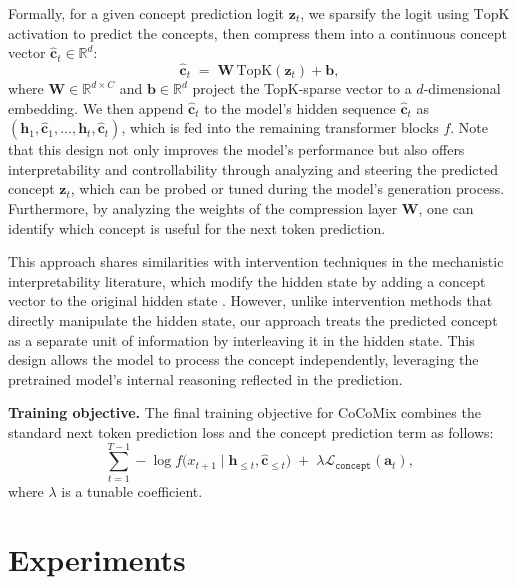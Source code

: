 \documentclass[]{fairmeta}
\def\rva{{\mathbf{a}}}
\def\rvb{{\mathbf{b}}}
\def\rvc{{\mathbf{c}}}
\def\rvh{{\mathbf{h}}}
\def\rvz{{\mathbf{z}}}
\def\rmW{{\mathbf{W}}}
\newcommand{\sname}{CoCoMix\xspace}
\begin{document}
Formally, for a given concept prediction logit $\rvz_t$, we sparsify the logit using $\mathrm{TopK}$ activation to predict the concepts, then compress them into a continuous concept vector $\hat{\rvc}_t \in \mathbb{R}^{d}$:
\begin{equation}
    \hat{\rvc}_t \;=\; \rmW\, \mathrm{TopK}(\rvz_t) + \rvb,
    \label{eq:compress}
\end{equation}
where $\rmW \in \mathbb{R}^{d \times C}$ and $\rvb \in \mathbb{R}^{d}$ project the TopK-sparse vector to a $d$-dimensional embedding. We then append $\hat{\rvc}_t$ to the model’s hidden sequence $\hat{\rvc}_t$ as $(\rvh_{1}, \hat{\rvc}_{1}, \ldots, \rvh_{t}, \hat{\rvc}_{t})$, which is fed into the remaining transformer blocks $f$. Note that this design not only improves the model’s performance but also offers interpretability and controllability through analyzing and steering the predicted concept $\rvz_t$, which can be probed or tuned during the model's generation process. Furthermore, by analyzing the weights of the compression layer $\rmW$, one can identify which concept is useful for the next token prediction. 

This approach shares similarities with intervention techniques in the mechanistic interpretability literature, which modify the hidden state by adding a concept vector to the original hidden state \citep{zou2023representation,wu2024reft}. However, unlike intervention methods that directly manipulate the hidden state, our approach treats the predicted concept as a separate unit of information by interleaving it in the hidden state. This design allows the model to process the concept independently, leveraging the pretrained model's internal reasoning reflected in the prediction. 

\textbf{Training objective.}
The final training objective for \sname combines the standard next token prediction loss and the concept prediction term as follows:
\begin{equation}
    \sum_{t=1}^{T-1} -\log f\bigl(x_{t+1}\mid \rvh_{\leq t}, \hat{\rvc}_{\leq t}\bigr)
    \;+\;
    \lambda \mathcal{L}_{\mathtt{concept}}(\rva_t),
    \label{eq:final}
\end{equation}
where $\lambda$ is a tunable coefficient. 



\section{Experiments}
\label{sec:experiments}
\end{document}
